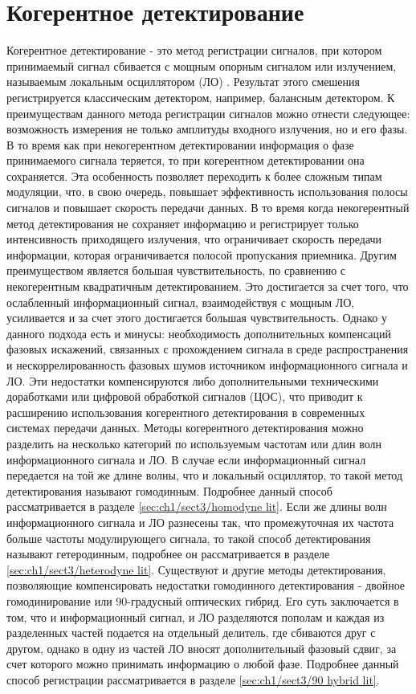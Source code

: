\section{Когерентное детектирование}\label{sec:ch1/sect3}
Когерентное детектирование - это метод регистрации сигналов, при котором принимаемый сигнал сбивается с мощным опорным сигналом или излучением, называемым локальным осциллятором (ЛО) \cite{ip2008a}. Результат этого смешения регистрируется классическим детектором, например, балансным детектором. К преимуществам данного метода регистрации сигналов  можно отнести следующее: возможность измерения не только амплитуды входного излучения, но и его фазы. В то время как при некогерентном детектировании информация о фазе принимаемого сигнала теряется, то при когерентном детектировании она сохраняется. Эта особенность позволяет переходить к более сложным типам модуляции, что, в свою очередь, повышает эффективность использования полосы сигналов и повышает скорость передачи данных. В то время когда некогерентный метод детектирования не сохраняет информацию и регистрирует только интенсивность приходящего излучения, что ограничивает скорость передачи информации, которая ограничивается полосой пропускания приемника. Другим преимуществом является большая чувствительность, по сравнению с некогерентным квадратичным детектированием. Это достигается за счет того, что ослабленный информационный сигнал, взаимодействуя с мощным ЛО, усиливается и за счет этого достигается большая чувствительность. 
Однако у данного подхода есть и минусы: необходимость дополнительных компенсаций фазовых искажений, связанных с прохождением сигнала в среде распространения и нескоррелированность фазовых шумов источником информационного сигнала и ЛО.  Эти недостатки компенсируются либо дополнительными техническими доработками или цифровой обработкой сигналов (ЦОС), что приводит к расширению использования когерентного детектирования в современных системах передачи данных.
\newline Методы когерентного детектирования можно разделить на несколько категорий по используемым частотам или длин волн информационного сигнала и ЛО. В случае если информационный сигнал передается на той же длине волны, что и локальный осциллятор, то такой метод детектирования называют гомодинным. Подробнее данный способ рассматривается в разделе \ref{sec:ch1/sect3/homodyne lit}.
Если же длины волн информационного сигнала и ЛО разнесены так, что промежуточная их частота больше частоты модулирующего сигнала, то такой способ детектирования называют гетеродинным, подробнее он рассматривается в разделе \ref{sec:ch1/sect3/heterodyne lit}. Существуют и другие методы детектирования, позволяющие компенсировать недостатки гомодинного детектирования - двойное гомодинирование или 90-градусный оптических гибрид. Его суть заключается в том, что и информационный сигнал, и ЛО разделяются пополам и каждая из разделенных частей подается на отдельный делитель, где сбиваются друг с другом, однако в одну из частей ЛО вносят дополнительный фазовый сдвиг, за счет которого можно принимать информацию о любой фазе. Подробнее данный способ регистрации рассматривается в разделе \ref{sec:ch1/sect3/90 hybrid lit}.

